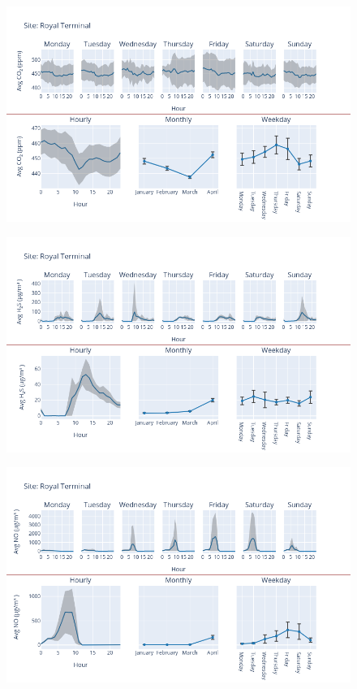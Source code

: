 \documentclass[12pt, oneside]{book}
\begin{document}
{ 
{\begin{figure}[H] 
 \centering 
\includegraphics[width=.88\textwidth, keepaspectratio]{image140} 
 \end{figure}}{} 

{\begin{figure}[H] 
 \centering 
\includegraphics[width=.88\textwidth, keepaspectratio]{image141} 
 \end{figure}}{} 

{\begin{figure}[H] 
 \centering 
\includegraphics[width=.88\textwidth, keepaspectratio]{image142} 
 \end{figure}}{} 

}
\end{document}
